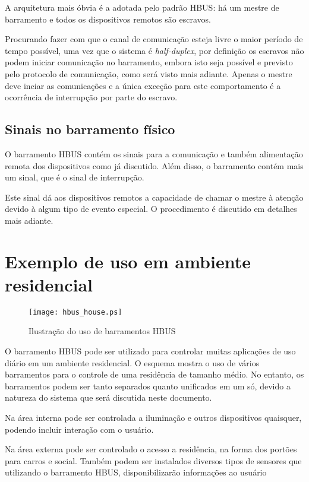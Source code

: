 \documentclass[11pt]{report}
\begin{document}
A arquitetura mais óbvia é a adotada pelo padrão HBUS: há um mestre de barramento e todos os dispositivos remotos são escravos.

Procurando fazer com que o canal de comunicação esteja livre o maior período de tempo possível, uma vez que o sistema é \textit{half-duplex}, por definição os escravos não podem iniciar comunicação no barramento, embora isto seja possível e previsto pelo protocolo de comunicação, como será visto mais adiante. Apenas o mestre deve inciar as comunicações e a única exceção para este comportamento é a ocorrência de interrupção por parte do escravo.

\subsection{Sinais no barramento físico}

O barramento HBUS contém os sinais para a comunicação e também alimentação remota dos dispositivos como já discutido. Além disso, o barramento contém mais um sinal, que é o sinal de interrupção.

Este sinal dá aos dispositivos remotos a capacidade de chamar o mestre à atenção devido à algum tipo de evento especial. O procedimento é discutido em detalhes mais adiante.

\section{Exemplo de uso em ambiente residencial}

\begin{figure}[H]
\centering
\texttt{[image: hbus\_house.ps]}
\caption{Ilustração do uso de barramentos HBUS}
\end{figure}

O barramento HBUS pode ser utilizado para controlar muitas aplicações de uso diário em um ambiente residencial. O esquema mostra o uso de vários barramentos para o controle de uma residência de tamanho médio. No entanto, os barramentos podem ser tanto separados quanto unificados em um só, devido a natureza do sistema que será discutida neste documento.

Na área interna pode ser controlada a iluminação e outros dispositivos quaisquer, podendo incluir interação com o usuário.

Na área externa pode ser controlado o acesso a residência, na forma dos portões para carros e social. Também podem ser instalados diversos tipos de sensores que utilizando o barramento HBUS, disponibilizarão informações ao usuário
\end{document}
